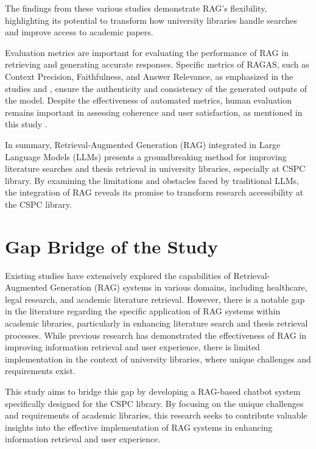 \begin{refsection}
The findings from these various studies demonstrate RAG's flexibility, highlighting its potential to transform how university libraries handle searches and improve access to academic papers.

Evaluation metrics are important for evaluating the performance of RAG in retrieving and generating accurate responses. Specific metrics of RAGAS, such as Context Precision, Faithfulness, and Answer Relevance, as emphasized in the studies \cite{sagi2024genai} and \cite{arzideh2024miracle}, ensure the authenticity and consistency of the generated outputs of the model. Despite the effectiveness of automated metrics, human evaluation remains important in assessing coherence and user satisfaction, as mentioned in this study \cite{aquino2024extracting}.

 In summary, Retrieval-Augmented Generation (RAG) integrated in Large Language Models (LLMs) presents a groundbreaking method for improving literature searches and thesis retrieval in university libraries, especially at CSPC library. By examining the limitations and obstacles faced by traditional LLMs, the integration of RAG reveals its promise to transform research accessibility at the CSPC library.

\section{Gap Bridge of the Study}


Existing studies have extensively explored the capabilities of Retrieval-Augmented Generation (RAG) systems in various domains, including healthcare, legal research, and academic literature retrieval. However, there is a notable gap in the literature regarding the specific application of RAG systems within academic libraries, particularly in enhancing literature search and thesis retrieval processes. While previous research has demonstrated the effectiveness of RAG in improving information retrieval and user experience, there is limited implementation in the context of university libraries, where unique challenges and requirements exist.

\newpage
This study aims to bridge this gap by developing a RAG-based chatbot system specifically designed for the CSPC library. By focusing on the unique challenges and requirements of academic libraries, this research seeks to contribute valuable insights into the effective implementation of RAG systems in enhancing information retrieval and user experience.


\clearpage

\printbibliography[heading=subbibintoc, title={\centering Notes}]
\end{refsection}
